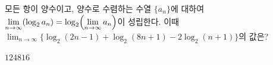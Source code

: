 모든 항이 양수이고, 양수로 수렴하는 수열 $\{a_n\}$에 대하여 $\displaystyle\lim_{n\to\infty}(\log_2 a_n)=\log_2\Bigl(\lim_{n\to\infty}a_n\Bigr)$이 성립한다. 이때 $\displaystyle\lim_{n\to\infty}\{\log_2(2n-1)+\log_2(8n+1)-2\log_2(n+1)\}$의 값은?
\begin{choices32}{$1$}{$2$}{$4$}{$8$}{$16$}\end{choices32}
